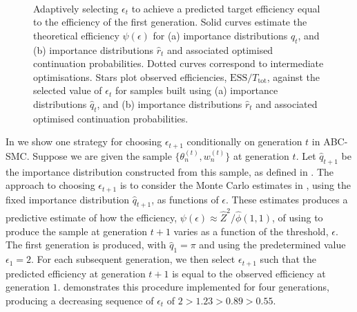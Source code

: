 \documentclass[review]{siamonline190516}
\begin{document}
\begin{figure}
    \centering
    ~
    \caption{
    Adaptively selecting $\epsilon_t$ to achieve a predicted target efficiency equal to the efficiency of the first generation. 
    Solid curves estimate the theoretical efficiency $\psi(\epsilon)$ for (a) importance distributions $\hat q_t$, and (b) importance distributions $\hat r_t$ and associated optimised continuation probabilities.
    Dotted curves correspond to intermediate optimisations.
    Stars plot observed efficiencies, $\mathrm{ESS}/T_{\mathrm{tot}}$, against the selected value of $\epsilon_t$ for samples built using (a) importance distributions $\hat q_t$, and (b) importance distributions $\hat r_t$ and associated optimised continuation probabilities.
    }
    \label{fig:adaptive}
\end{figure}

In  we show one strategy for choosing $\epsilon_{t+1}$ conditionally on generation $t$ in ABC-SMC.
Suppose we are given the sample $\{ \theta_n^{(t)}, w_n^{(t)} \}$ at generation $t$.
Let $\hat q_{t+1}$ be the importance distribution constructed from this sample, as defined in .
The approach to choosing $\epsilon_{t+1}$ is to consider the Monte Carlo estimates in , using the fixed importance distribution $\hat q_{t+1}$, as functions of $\epsilon$.
These estimates produces a predictive estimate of how the efficiency, $\psi(\epsilon) \approx \hat Z^2 / \hat \phi(1,1)$, of using  to produce the sample at generation $t+1$ varies as a function of the threshold, $\epsilon$.
The first generation is produced, with $\hat q_1 = \pi$ and using the predetermined value $\epsilon_1 = 2$.
For each subsequent generation, we then select $\epsilon_{t+1}$ such that the predicted efficiency at generation $t+1$ is equal to the observed efficiency at generation $1$.
 demonstrates this procedure implemented for four generations, producing a decreasing sequence of $\epsilon_t$ of $2 > 1.23 > 0.89 > 0.55$.
\end{document}
